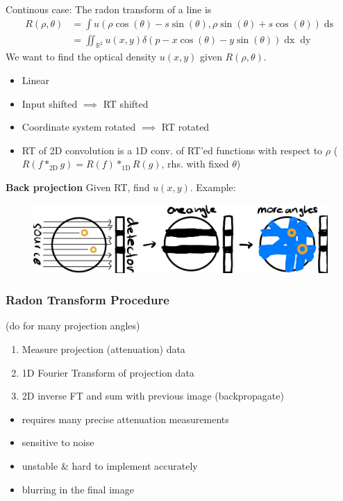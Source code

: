 \documentclass[a4paper,10pt]{article}
\newcommand*\bad{\item[\textcolor{badred}{\(\bm{-}\)}]}
\begin{document}
Continous case: The radon transform of a line is 
\begin{align*}
    R(\rho , \theta) &= \int u(\rho \cos (\theta ) - s \sin (\theta ), \rho \sin (\theta ) + s \cos (\theta )) \mathop{ds} \\&= \iint_{\mathbb{R}^2} u(x,y) \delta (p - x \cos (\theta) - y \sin (\theta) ) \mathop{dx} \mathop{dy}
\end{align*}
We want to find the optical density \( u(x,y) \) given \( R(\rho , \theta ) \).

\begin{itemize}
    \item Linear
    \item Input shifted \( \implies \) RT shifted
    \item Coordinate system rotated \( \implies \) RT rotated
    \item RT of 2D convolution is a 1D conv. of RT'ed functions with respect to \( \rho \) (\( R(f*_\text{2D} g) = R(f) *_\text{1D} R(g) \), rhs. with fixed \( \theta  \))
\end{itemize}
\textbf{Back projection} Given RT, find \( u(x,y) \). Example:
\begin{figure}[h]
    \includegraphics[width=\linewidth]{radon-back-projection.jpeg}
\end{figure}

\subsubsection{Radon Transform Procedure} (do for many projection angles)
\begin{enumerate}
    \item Measure projection (attenuation) data
    \item 1D Fourier Transform of projection data
    \item 2D inverse FT and sum with previous image (backpropagate)
\end{enumerate}
\begin{itemize}
    \bad requires many precise attenuation measurements
    \bad sensitive to noise
    \bad unstable \& hard to implement accurately
    \bad blurring in the final image
\end{itemize}
\end{document}
